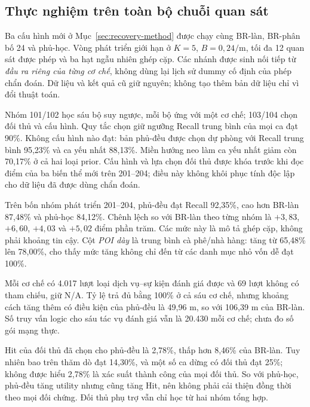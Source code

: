 \subsection{Thực nghiệm trên toàn bộ chuỗi quan sát}

Ba cấu hình mới ở Mục~\ref{sec:recovery-method} được chạy cùng BR-làn, BR-phân bố 24 và phủ-học. Vòng phát triển giới hạn ở $K=5$, $B=0{,}24/\mathrm m$, tối đa 12 quan sát được phép và ba hạt ngẫu nhiên ghép cặp. Các nhánh được sinh nối tiếp từ \emph{đầu ra riêng của từng cơ chế}, không dùng lại lịch sử dummy cố định của phép chẩn đoán. Dữ liệu và kết quả cũ giữ nguyên; không tạo thêm bản dữ liệu chỉ vì đổi thuật toán.

Nhóm 101/102 học sáu bộ suy ngược, mỗi bộ ứng với một cơ chế; 103/104 chọn đối thủ và cấu hình. Quy tắc chọn giữ ngưỡng Recall trung bình của mọi ca đạt 90\%. Không cấu hình nào đạt: bản phủ-đều được chọn dự phòng với Recall trung bình 95,23\% và ca yếu nhất 88,13\%. Miền hướng neo làm ca yếu nhất giảm còn 70,17\% ở cả hai loại prior. Cấu hình và lựa chọn đối thủ được khóa trước khi đọc điểm của ba biến thể mới trên 201--204; điều này không khôi phục tính độc lập cho dữ liệu đã được dùng chẩn đoán.



Trên bốn nhóm phát triển 201--204, phủ-đều đạt Recall 92,35\%, cao hơn BR-làn 87,48\% và phủ-học 84,12\%. Chênh lệch so với BR-làn theo từng nhóm là $+3{,}83$, $+6{,}60$, $+4{,}03$ và $+5{,}02$ điểm phần trăm. Các mức này là mô tả ghép cặp, không phải khoảng tin cậy. Cột \emph{POI dày} là trung bình cà phê/nhà hàng: tăng từ 65,48\% lên 78,00\%, cho thấy mức tăng không chỉ đến từ các danh mục nhỏ vốn dễ đạt 100\%.

Mỗi cơ chế có 4.017 lượt loại dịch vụ--sự kiện đánh giá được và 69 lượt không có tham chiếu, giữ N/A. Tỷ lệ trả đủ bằng 100\% ở cả sáu cơ chế, nhưng khoảng cách tăng thêm có điều kiện của phủ-đều là 49,96 m, so với 106,39 m của BR-làn. Số truy vấn logic cho sáu tác vụ đánh giá vẫn là 20.430 mỗi cơ chế; chưa đo số gói mạng thực.

Hit của đối thủ đã chọn cho phủ-đều là 2,78\%, thấp hơn 8,46\% của BR-làn. Tuy nhiên bao trên thăm dò đạt 14,30\%, và một số ca dừng có đối thủ đạt 25\%; không được hiểu 2,78\% là xác suất thành công của mọi đối thủ. So với phủ-học, phủ-đều tăng utility nhưng cũng tăng Hit, nên không phải cải thiện đồng thời theo mọi đối chứng. Đối thủ phụ trợ vẫn chỉ học từ hai nhóm tổng hợp.

